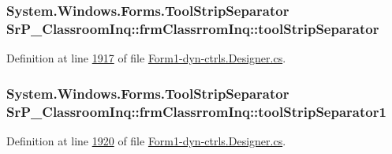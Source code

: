 \hypertarget{class_sr_p___classroom_inq_1_1frm_classrrom_inq_a442caa4a21bb4dac8b91d82e24bec584}{
\subsubsection[{tool\-Strip\-Separator}]{\setlength{\rightskip}{0pt plus 5cm}\-System.\-Windows.\-Forms.\-Tool\-Strip\-Separator {\bf \-Sr\-P\-\_\-\-Classroom\-Inq\-::frm\-Classrrom\-Inq\-::tool\-Strip\-Separator}}}
\label{class_sr_p___classroom_inq_1_1frm_classrrom_inq_a442caa4a21bb4dac8b91d82e24bec584}


\-Definition at line \hyperlink{_form1-dyn-ctrls_8_designer_8cs_source_l01917}{1917} of file \hyperlink{_form1-dyn-ctrls_8_designer_8cs_source}{\-Form1-\/dyn-\/ctrls.\-Designer.\-cs}.

\hypertarget{class_sr_p___classroom_inq_1_1frm_classrrom_inq_a3bec3b534d141382d4525a9be840e911}{
\subsubsection[{tool\-Strip\-Separator1}]{\setlength{\rightskip}{0pt plus 5cm}\-System.\-Windows.\-Forms.\-Tool\-Strip\-Separator {\bf \-Sr\-P\-\_\-\-Classroom\-Inq\-::frm\-Classrrom\-Inq\-::tool\-Strip\-Separator1}}}
\label{class_sr_p___classroom_inq_1_1frm_classrrom_inq_a3bec3b534d141382d4525a9be840e911}


\-Definition at line \hyperlink{_form1-dyn-ctrls_8_designer_8cs_source_l01920}{1920} of file \hyperlink{_form1-dyn-ctrls_8_designer_8cs_source}{\-Form1-\/dyn-\/ctrls.\-Designer.\-cs}.

